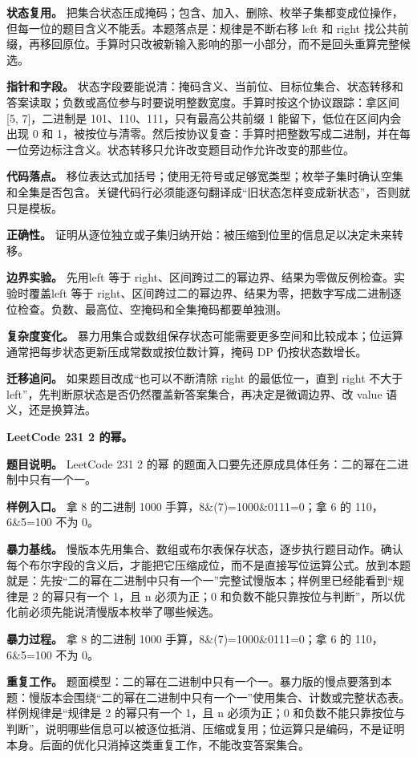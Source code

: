 \textbf{状态复用。} 把集合状态压成掩码；包含、加入、删除、枚举子集都变成位操作，但每一位的题目含义不能丢。本题落点是：规律是不断右移 left 和 right 找公共前缀，再移回原位。手算时只改被新输入影响的那一小部分，而不是回头重算完整候选。

\textbf{指针和字段。} 状态字段要能说清：掩码含义、当前位、目标位集合、状态转移和答案读取；负数或高位参与时要说明整数宽度。手算时按这个协议跟踪：拿区间 [5, 7]，二进制是 101、110、111，只有最高公共前缀 1 能留下，低位在区间内会出现 0 和 1，被按位与清零。然后按协议复查：手算时把整数写成二进制，并在每一位旁边标注含义。状态转移只允许改变题目动作允许改变的那些位。

\textbf{代码落点。} 移位表达式加括号；使用无符号或足够宽类型；枚举子集时确认空集和全集是否包含。关键代码行必须能逐句翻译成“旧状态怎样变成新状态”，否则就只是模板。

\textbf{正确性。} 证明从逐位独立或子集归纳开始：被压缩到位里的信息足以决定未来转移。

\textbf{边界实验。} 先用left 等于 right、区间跨过二的幂边界、结果为零做反例检查。实验时覆盖left 等于 right、区间跨过二的幂边界、结果为零，把数字写成二进制逐位检查。负数、最高位、空掩码和全集掩码都要单独测。

\textbf{复杂度变化。} 暴力用集合或数组保存状态可能需要更多空间和比较成本；位运算通常把每步状态更新压成常数或按位数计算，掩码 DP 仍按状态数增长。

\textbf{迁移追问。} 如果题目改成“也可以不断清除 right 的最低位一，直到 right 不大于 left”，先判断原状态是否仍然覆盖新答案集合，再决定是微调边界、改 value 语义，还是换算法。

\noindent\textbf{LeetCode 231 2 的幂。}

\textbf{题目说明。} LeetCode 231 2 的幂 的题面入口要先还原成具体任务：二的幂在二进制中只有一个一。

\textbf{样例入口。} 拿 8 的二进制 1000 手算，8\&(7)=1000\&0111=0；拿 6 的 110，6\&5=100 不为 0。

\textbf{暴力基线。} 慢版本先用集合、数组或布尔表保存状态，逐步执行题目动作。确认每个布尔字段的含义后，才能把它压缩成位，而不是直接写位运算公式。放到本题就是：先按“二的幂在二进制中只有一个一”完整试慢版本；样例里已经能看到“规律是 2 的幂只有一个 1，且 n 必须为正；0 和负数不能只靠按位与判断”，所以优化前必须先能说清慢版本枚举了哪些候选。

\textbf{暴力过程。} 拿 8 的二进制 1000 手算，8\&(7)=1000\&0111=0；拿 6 的 110，6\&5=100 不为 0。

\textbf{重复工作。} 题面模型：二的幂在二进制中只有一个一。暴力版的慢点要落到本题：慢版本会围绕“二的幂在二进制中只有一个一”使用集合、计数或完整状态表。样例规律是“规律是 2 的幂只有一个 1，且 n 必须为正；0 和负数不能只靠按位与判断”，说明哪些信息可以被逐位抵消、压缩或复用；位运算只是编码，不是证明本身。后面的优化只消掉这类重复工作，不能改变答案集合。

